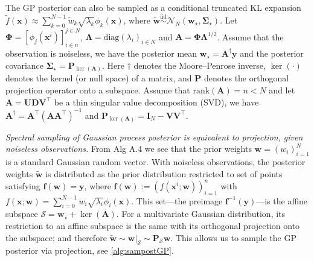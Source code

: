 \documentclass{article}
\begin{document}

The GP posterior can also be sampled as a conditional truncated KL expansion
$\widetilde{f}(\mathbf{x}) \approx \sum_{k=0}^{N-1} \widetilde{w}_k \sqrt{\lambda_k} \phi_k(\mathbf{x})$,
where
$\widetilde{\mathbf{w}} \overset{\text{iid}}{\sim} \mathcal{N}_N(\mathbf{w}_\star, \boldsymbol{\Sigma}_\star)$.
Let $\boldsymbol{\Phi} = [\phi_j(\mathbf{x}^i)]_{i \in n}^{j \in N}$,
$\boldsymbol{\Lambda} = \mathrm{diag}(\lambda_i)_{i \in N}$ and
$\mathbf{A} = \boldsymbol{\Phi} \boldsymbol{\Lambda}^{1/2}$. Assume
that the observation is noiseless, we have
the posterior mean $\mathbf{w}_\star = \mathbf{A}^\dagger \mathbf{y}$
and the posterior covariance
$\boldsymbol{\Sigma}_\star = \mathbf{P}_{\ker(\mathbf{A})}$. Here
$\dagger$ denotes the Moore--Penrose inverse, $\ker(\cdot)$ denotes the
kernel (or null space) of a matrix, and $\mathbf{P}$ denotes the
orthogonal projection operator onto a subspace. Assume that
$\mathrm{rank}(\mathbf{A}) = n < N$ and let
$\mathbf{A} = \mathbf{U} \mathbf{D} \mathbf{V}^\intercal$ be a thin singular value decomposition (SVD), we have
$\mathbf{A}^\dagger = \mathbf{A}^\intercal (\mathbf{A} \mathbf{A}^\intercal)^{-1}$
and
$\mathbf{P}_{\ker(\mathbf{A})} = \mathbf{I}_N - \mathbf{V} \mathbf{V}^\intercal$.

\emph{Spectral sampling of Gaussian process posterior is equivalent to
	projection, given noiseless observations.} From Alg A.4 we see that the
prior weights $\mathbf{w} = (w_i)_{i=1}^N$ is a standard Gaussian
random vector. With noiseless observations, the posterior weights
$\widetilde{\mathbf{w}}$ is distributed as the prior distribution
restricted to set of points satisfying
$\mathbf{f}(\mathbf{w}) = \mathbf{y}$, where
$\mathbf{f}(\mathbf{w}) := (f(\mathbf{x}^i; \mathbf{w}))_{i=1}^n$ with
$f(\mathbf{x}; \mathbf{w}) = \sum_{i=0}^{N-1} w_i \sqrt{\lambda_i} \phi_i(\mathbf{x})$.
This set---the preimage $\mathbf{f}^{-1}(\mathbf{y})$---is the affine
subspace $\mathcal{S} = \mathbf{w}_\star + \ker(\mathbf{A})$. For a
multivariate Gaussian distribution, its restriction to an affine
subspace is the same with its orthogonal projection onto the subspace;
and therefore
$\widetilde{\mathbf{w}} \sim \mathbf{w}|_{\mathcal{S}} \sim \mathbf{P}_{\mathcal{S}} \mathbf{w}$.
This allows us to sample the GP posterior via projection, see \cref{alg:sampostGP}.
\end{document}
